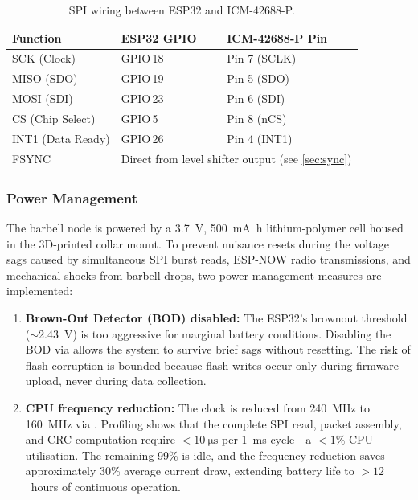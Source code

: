 \begin{table}[H]
  \centering
  \caption{SPI wiring between ESP32 and ICM-42688-P.}
  \label{tab:spi_wiring}
  \begin{tabular}{lll}
    \toprule
    \textbf{Function} & \textbf{ESP32 GPIO} & \textbf{ICM-42688-P Pin} \\
    \midrule
    SCK (Clock)      & GPIO\,18 & Pin 7 (SCLK) \\
    MISO (SDO)       & GPIO\,19 & Pin 5 (SDO) \\
    MOSI (SDI)       & GPIO\,23 & Pin 6 (SDI) \\
    CS (Chip Select)  & GPIO\,5  & Pin 8 (nCS) \\
    INT1 (Data Ready) & GPIO\,26 & Pin 4 (INT1) \\
    FSYNC             & \multicolumn{2}{l}{Direct from level shifter output (see \cref{sec:sync})} \\
    \bottomrule
  \end{tabular}
\end{table}

\subsubsection{Power Management}
The barbell node is powered by a \SI{3.7}{\volt}, \SI{500}{\milli\ampere\hour} lithium-polymer cell housed in the 3D-printed collar mount.
To prevent nuisance resets during the voltage sags caused by simultaneous SPI burst reads, ESP-NOW radio transmissions, and mechanical shocks from barbell drops, two power-management measures are implemented:
\begin{enumerate}[nosep]
  \item \textbf{Brown-Out Detector (BOD) disabled:} The ESP32's brownout threshold ($\sim$\SI{2.43}{\volt}) is too aggressive for marginal battery conditions. Disabling the BOD via  allows the system to survive brief sags without resetting. The risk of flash corruption is bounded because flash writes occur only during firmware upload, never during data collection.
  \item \textbf{CPU frequency reduction:} The clock is reduced from \SI{240}{\mega\hertz} to \SI{160}{\mega\hertz} via . Profiling shows that the complete SPI read, packet assembly, and CRC computation require $<\SI{10}{\micro\second}$ per \SI{1}{\milli\second} cycle---a $<1\%$ CPU utilisation. The remaining 99\% is idle, and the frequency reduction saves approximately 30\% average current draw, extending battery life to $>12$~hours of continuous operation.
\end{enumerate}

